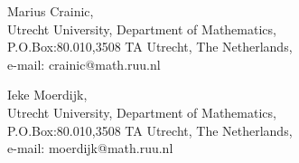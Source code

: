 \documentclass[a4paper]{article}
\begin{document}
Marius Crainic,\\
\hspace*{.2in}Utrecht University, Department of Mathematics,\\
\hspace*{.2in}P.O.Box:80.010,3508 TA Utrecht, The Netherlands,\\ 
\hspace*{.2in}e-mail: crainic@math.ruu.nl\\
\newline

Ieke Moerdijk,\\
\hspace*{.2in}Utrecht University, Department of Mathematics,\\ 
\hspace*{.2in}P.O.Box:80.010,3508 TA Utrecht, The Netherlands,\\ 
\hspace*{.2in}e-mail: moerdijk@math.ruu.nl
\end{document}
